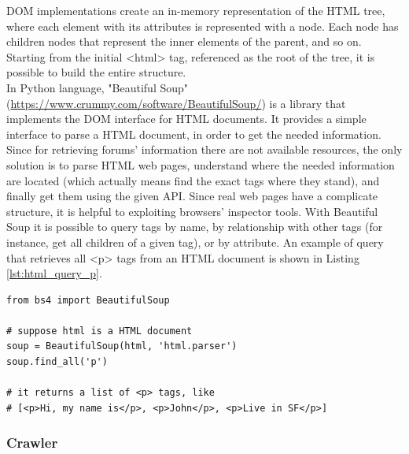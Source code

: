 \ac{DOM} implementations create an in-memory representation of the \ac{HTML} tree, where each element with its attributes is represented with a node. Each node has children nodes that represent the inner elements of the parent, and so on. Starting from the initial <html> tag, referenced as the root of the tree, it is possible to build the entire structure.\\

In Python language, "Beautiful Soup" (\url{https://www.crummy.com/software/BeautifulSoup/}) is a library that implements the \ac{DOM} interface for \ac{HTML} documents. It provides a simple interface to parse a \ac{HTML} document, in order to get the needed information. Since for retrieving forums' information there are not available resources, the only solution is to parse \ac{HTML} web pages, understand where the needed information are located (which actually means find the exact tags where they stand), and finally get them using the given \ac{API}. Since real web pages have a complicate structure, it is helpful to exploiting browsers'  inspector tools. With Beautiful Soup it is possible to query tags by name, by relationship with other tags (for instance, get all children of a given tag), or by attribute. An example of query that retrieves all <p> tags from an \ac{HTML} document is shown in Listing \ref{lst:html_query_p}.

\lstset{language=Python}
\lstset{frame=lines}
\lstset{basicstyle=\footnotesize}
\begin{lstlisting}
from bs4 import BeautifulSoup

# suppose html is a HTML document
soup = BeautifulSoup(html, 'html.parser')
soup.find_all('p')

# it returns a list of <p> tags, like
# [<p>Hi, my name is</p>, <p>John</p>, <p>Live in SF</p>]
\end{lstlisting}



\subsubsection{Crawler}

